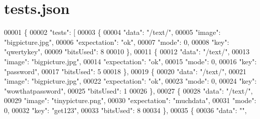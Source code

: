 \hypertarget{tests_8json}{\section{tests.\-json}
\label{tests_8json}
}

\begin{DoxyCode}
00001 \{
00002     \textcolor{stringliteral}{"tests"}: [
00003         \{
00004             \textcolor{stringliteral}{"data"}: \textcolor{stringliteral}{"/text/"},
00005             \textcolor{stringliteral}{"image"}: \textcolor{stringliteral}{"bigpicture.jpg"},
00006             \textcolor{stringliteral}{"expectation"}: \textcolor{stringliteral}{"ok"},
00007             \textcolor{stringliteral}{"mode"}: 0,
00008             \textcolor{stringliteral}{"key"}: \textcolor{stringliteral}{"qwertykey"},
00009             \textcolor{stringliteral}{"bitsUsed"}: 8
00010         \},
00011         \{
00012             \textcolor{stringliteral}{"data"}: \textcolor{stringliteral}{"/text/"},
00013             \textcolor{stringliteral}{"image"}: \textcolor{stringliteral}{"bigpicture.jpg"},
00014             \textcolor{stringliteral}{"expectation"}: \textcolor{stringliteral}{"ok"},
00015             \textcolor{stringliteral}{"mode"}: 0,
00016             \textcolor{stringliteral}{"key"}: \textcolor{stringliteral}{"password"},
00017             \textcolor{stringliteral}{"bitsUsed"}: 5
00018         \},
00019         \{
00020             \textcolor{stringliteral}{"data"}: \textcolor{stringliteral}{"/text/"},
00021             \textcolor{stringliteral}{"image"}: \textcolor{stringliteral}{"bigpicture.jpg"},
00022             \textcolor{stringliteral}{"expectation"}: \textcolor{stringliteral}{"ok"},
00023             \textcolor{stringliteral}{"mode"}: 0,
00024             \textcolor{stringliteral}{"key"}: \textcolor{stringliteral}{"wowthatpassword"},
00025             \textcolor{stringliteral}{"bitsUsed"}: 1
00026         \},
00027         \{
00028             \textcolor{stringliteral}{"data"}: \textcolor{stringliteral}{"/text/"},
00029             \textcolor{stringliteral}{"image"}: \textcolor{stringliteral}{"tinypicture.png"},
00030             \textcolor{stringliteral}{"expectation"}: \textcolor{stringliteral}{"muchdata"},
00031             \textcolor{stringliteral}{"mode"}: 0,
00032             \textcolor{stringliteral}{"key"}: \textcolor{stringliteral}{"get123"},
00033             \textcolor{stringliteral}{"bitsUsed"}: 8
00034         \},
00035         \{
00036             \textcolor{stringliteral}{"data"}: \textcolor{stringliteral}{""},

\end{DoxyCode}
